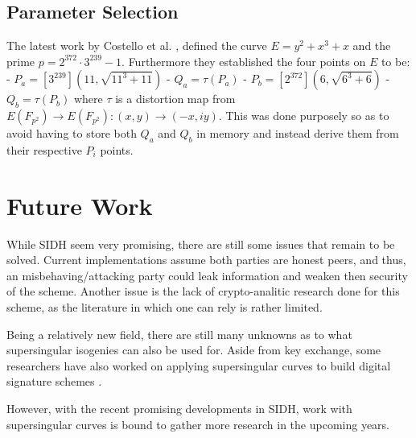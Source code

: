 \documentclass[10pt,twocolumn]{article} %
\begin{document}
\subsection{Parameter Selection}
\label{sec:params}
The latest work by Costello et al. \cite{costello2016}, defined the curve $E = y^2+x^3 +x$ and the prime $p = 2^372\cdot 3^239-1$. Furthermore they established the four points on $E$ to be:
- $P_{a} = [3^239](11,\sqrt{11^3+11})$ \newline
- $Q_a=\tau(P_a)$ \newline
- $P_b=[2^372](6,\sqrt{6^3+6})$ \newline
- $Q_b=\tau(P_b)$ \newline
where $\tau$ is a distortion map from $E(F_{p^2})\rightarrow E(F_{p^2}) : (x,y) \rightarrow (-x,iy)$. This was done purposely so as to avoid having to store both $Q_a$ and $Q_b$ in memory and instead derive them from their respective $P_i$ points.

\section{Future Work}
While SIDH seem very promising, there are still some issues that remain to be solved. Current implementations assume both parties are honest peers, and thus, an misbehaving/attacking party could leak information and weaken then security of the scheme. Another issue is the lack of crypto-analitic research done for this scheme, as the literature in which one can rely is rather limited.
\par Being a relatively new field, there are still many unknowns as to what supersingular isogenies can also be used for. Aside from key exchange, some researchers have also worked on applying supersingular curves to build digital signature schemes \cite{jao2014isogeny,sun2014toward}. 
\par However, with the recent promising developments in SIDH, work with supersingular curves is bound to gather more research in the upcoming years. 





\end{document}
